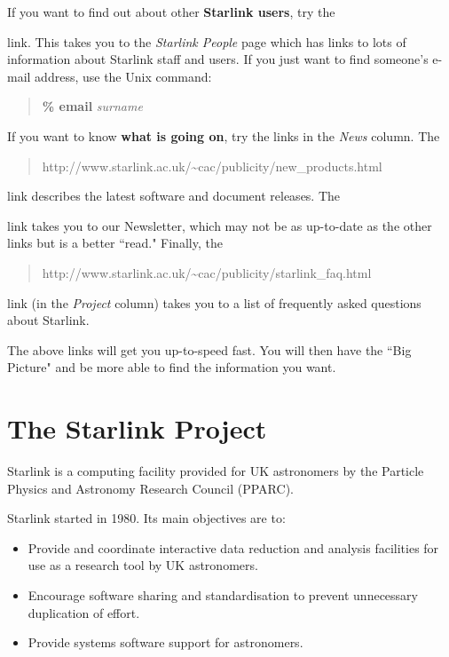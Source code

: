 \documentclass[twoside,11pt,nolof]{starlink}
\begin{document}
If you want to find out about other \textbf{Starlink users}, try the
\begin{quote}
\end{quote}
link.
This takes you to the \emph{Starlink People}\/ page which has links to lots of
information about Starlink staff and users.
If you just want to find someone's e-mail address, use the Unix command:
\begin{quote}
\textbf{\% email} \textit{surname}
\end{quote}
If you want to know \textbf{what is going on}, try the links in the \emph{News}\/
column.
The
\begin{quote}
{http://www.starlink.ac.uk/\~{}cac/publicity/new_products.html}
\end{quote}
link describes the latest software and document releases.
The
\begin{quote}
\end{quote}
link takes you to our Newsletter, which may not be as up-to-date as the other
links but is a better ``read."
Finally, the
\begin{quote}
{http://www.starlink.ac.uk/\~{}cac/publicity/starlink_faq.html}
\end{quote}
link (in the \emph{Project}\/ column) takes you to a list of frequently asked
questions about Starlink.

The above links will get you up-to-speed fast.
You will then have the ``Big Picture" and be more able to find the information
you want.

\newpage

\section{The Starlink Project}

Starlink is a computing facility provided for UK astronomers by the
Particle Physics and Astronomy Research Council (PPARC).

Starlink started in 1980.
Its main objectives are to:

\begin{itemize}
\item Provide and coordinate interactive data reduction and analysis facilities
for use as a research tool by UK astronomers.
\item Encourage software sharing and standardisation to prevent unnecessary
duplication of effort.
\item Provide systems software support for astronomers.
\end{itemize}
\end{document}
